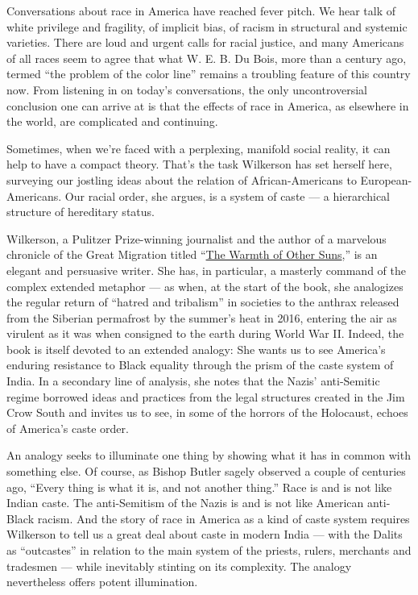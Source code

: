 Conversations about race in America have reached fever pitch. We hear
talk of white privilege and fragility, of implicit bias, of racism in
structural and systemic varieties. There are loud and urgent calls for
racial justice, and many Americans of all races seem to agree that what
W. E. B. Du Bois, more than a century ago, termed ``the problem of the
color line'' remains a troubling feature of this country now. From
listening in on today's conversations, the only uncontroversial
conclusion one can arrive at is that the effects of race in America, as
elsewhere in the world, are complicated and continuing.

Sometimes, when we're faced with a perplexing, manifold social reality,
it can help to have a compact theory. That's the task Wilkerson has set
herself here, surveying our jostling ideas about the relation of
African-Americans to European-Americans. Our racial order, she argues,
is a system of caste --- a hierarchical structure of hereditary status.

Wilkerson, a Pulitzer Prize-winning journalist and the author of a
marvelous chronicle of the Great Migration titled
``\href{https://www.nytimes.com/2010/09/09/books/09wilkerson.html?searchResultPosition=4https://www.nytimes.com/2010/09/05/books/review/Oshinsky-t.html?searchResultPosition=18}{The
Warmth of Other Suns},'' is an elegant and persuasive writer. She has,
in particular, a masterly command of the complex extended metaphor ---
as when, at the start of the book, she analogizes the regular return of
``hatred and tribalism'' in societies to the anthrax released from the
Siberian permafrost by the summer's heat in 2016, entering the air as
virulent as it was when consigned to the earth during World War II.
Indeed, the book is itself devoted to an extended analogy: She wants us
to see America's enduring resistance to Black equality through the prism
of the caste system of India. In a secondary line of analysis, she notes
that the Nazis' anti-Semitic regime borrowed ideas and practices from
the legal structures created in the Jim Crow South and invites us to
see, in some of the horrors of the Holocaust, echoes of America's caste
order.

An analogy seeks to illuminate one thing by showing what it has in
common with something else. Of course, as Bishop Butler sagely observed
a couple of centuries ago, ``Every thing is what it is, and not another
thing.'' Race is and is not like Indian caste. The anti-Semitism of the
Nazis is and is not like American anti-Black racism. And the story of
race in America as a kind of caste system requires Wilkerson to tell us
a great deal about caste in modern India --- with the Dalits as
``outcastes'' in relation to the main system of the priests, rulers,
merchants and tradesmen --- while inevitably stinting on its complexity.
The analogy nevertheless offers potent illumination.

